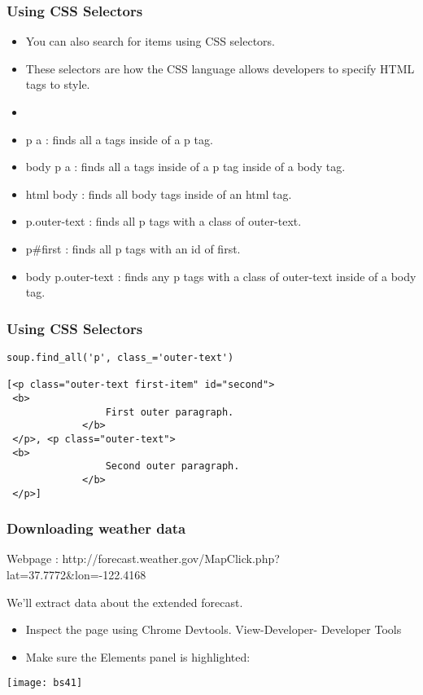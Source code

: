 \begin{frame}[fragile]\frametitle{Using CSS Selectors}
    \begin{itemize}
    \item You can also search for items using CSS selectors. 
    \item These selectors are how the CSS language allows developers to specify HTML tags to style.
\item 
\item     p a : finds all a tags inside of a p tag.
\item     body p a : finds all a tags inside of a p tag inside of a body tag.
\item     html body : finds all body tags inside of an html tag.
\item     p.outer-text : finds all p tags with a class of outer-text.
\item     p\#first : finds all p tags with an id of first.
\item     body p.outer-text : finds any p tags with a class of outer-text inside of a body tag.

    \end{itemize}

\end{frame}

\begin{frame}[fragile]\frametitle{Using CSS Selectors}
            \begin{lstlisting}
soup.find_all('p', class_='outer-text')

[<p class="outer-text first-item" id="second">
 <b>
                 First outer paragraph.
             </b>
 </p>, <p class="outer-text">
 <b>
                 Second outer paragraph.
             </b>
 </p>]
\end{lstlisting}
\end{frame}

\begin{frame}[fragile]\frametitle{Downloading weather data}
Webpage : http://forecast.weather.gov/MapClick.php?lat=37.7772\&lon=-122.4168

We'll extract data about the extended forecast.
    \begin{itemize}
    \item Inspect the page using Chrome Devtools. View-Developer- Developer Tools
	\item  Make sure the Elements panel is highlighted:
	    \end{itemize}
	    \begin{center}
\texttt{[image: bs41]}
\end{center}
\end{frame}


